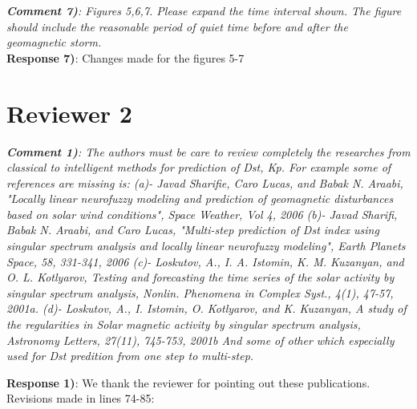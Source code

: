 \documentclass{article}
\begin{document}
\textit{
\textbf{Comment 7)}: Figures 5,6,7. Please expand the time interval shown. The figure should include the reasonable period of quiet time before and after the geomagnetic storm.
}\\
 
\textbf{Response 7)}: Changes made for the figures 5-7

\newpage
\section*{Reviewer 2}

\textit{
\textbf{Comment 1)}: 
The authors must be care to review completely the researches from classical to intelligent methods for prediction of Dst, Kp. For example some of references are missing is: 
(a)- Javad Sharifie, Caro Lucas, and Babak N. Araabi, "Locally linear neurofuzzy modeling and prediction 
of geomagnetic disturbances based on solar wind conditions", Space Weather, Vol 4, 2006 
(b)- Javad Sharifi, Babak N. Araabi, and Caro Lucas, "Multi-step prediction of Dst index using singular spectrum analysis and locally linear neurofuzzy modeling", Earth Planets Space, 58, 331-341, 2006 
(c)- Loskutov, A., I. A. Istomin, K. M. Kuzanyan, and O. L. Kotlyarov, Testing and forecasting the time series of the solar activity by singular spectrum analysis, Nonlin. Phenomena in Complex Syst., 4(1), 47-57, 2001a. 
(d)- Loskutov, A., I. Istomin, O. Kotlyarov, and K. Kuzanyan, A study of the regularities in Solar magnetic activity by singular spectrum analysis, Astronomy Letters, 27(11), 745-753, 2001b 
And some of other which especially used for Dst predition from one step to multi-step.
}

\textbf{Response 1)}: We thank the reviewer for pointing out these publications. Revisions made in lines 74-85:\\
\\
\\
\end{document}
